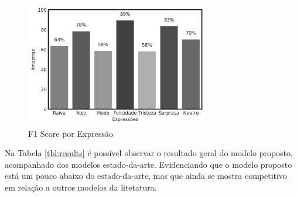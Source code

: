 \begin{figure}[!htb]
    \centering
    \includegraphics[width=8cm]{images/f1_bar.png}
    \caption{F1 Score por Expressão}
    \label{fig:f1_bar}
\end{figure}

Na Tabela \ref{tbl:results} é possível observar o resultado geral do modelo proposto, acompanhado dos modelos estado-da-arte. Evidenciando que o modelo proposto está um pouco abaixo do estado-da-arte, mas que ainda se mostra competitivo em relação a outros modelos da litetatura. 


